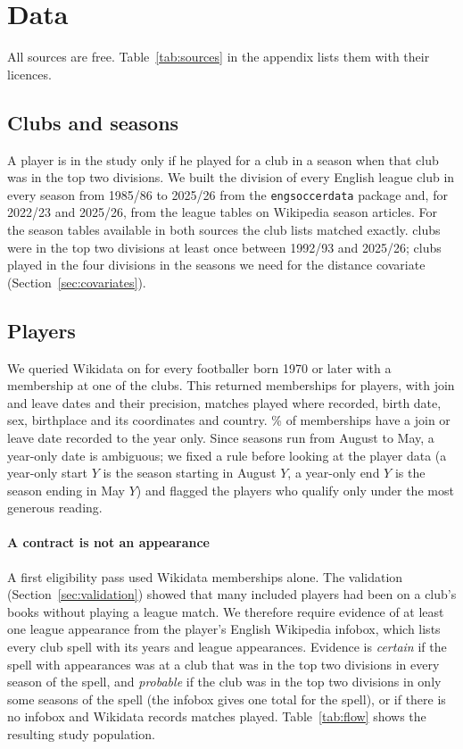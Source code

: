 \section{Data}
\label{sec:data}

All sources are free. Table~\ref{tab:sources} in the appendix lists them with their licences.

\subsection{Clubs and seasons}
A player is in the study only if he played for a club in a season when that club was in the top two divisions. We built the division of every English league club in every season from 1985/86 to 2025/26 from the \texttt{engsoccerdata} package \cite{curley2016} and, for 2022/23 and 2025/26, from the league tables on Wikipedia season articles. For the \nSeasonTables{} season tables available in both sources the club lists matched exactly. \nClubsTopTwo{} clubs were in the top two divisions at least once between 1992/93 and 2025/26; \nClubsAll{} clubs played in the four divisions in the seasons we need for the distance covariate (Section~\ref{sec:covariates}).

\subsection{Players}
We queried Wikidata \cite{vrandecic2014} on \snapshotDate{} for every footballer born 1970 or later with a membership at one of the \nClubsTopTwo{} clubs. This returned \nMemberships{} memberships for \nFetched{} players, with join and leave dates and their precision, matches played where recorded, birth date, sex, birthplace and its coordinates and country. \shareYearOnly\% of memberships have a join or leave date recorded to the year only. Since seasons run from August to May, a year-only date is ambiguous; we fixed a rule before looking at the player data (a year-only start $Y$ is the season starting in August $Y$, a year-only end $Y$ is the season ending in May $Y$) and flagged the \nAmbiguous{} players who qualify only under the most generous reading.

\paragraph{A contract is not an appearance} A first eligibility pass used Wikidata memberships alone. The validation (Section~\ref{sec:validation}) showed that many included players had been on a club's books without playing a league match. We therefore require evidence of at least one league appearance from the player's English Wikipedia infobox, which lists every club spell with its years and league appearances. Evidence is \emph{certain} if the spell with appearances was at a club that was in the top two divisions in every season of the spell, and \emph{probable} if the club was in the top two divisions in only some seasons of the spell (the infobox gives one total for the spell), or if there is no infobox and Wikidata records matches played. Table~\ref{tab:flow} shows the resulting study population.

